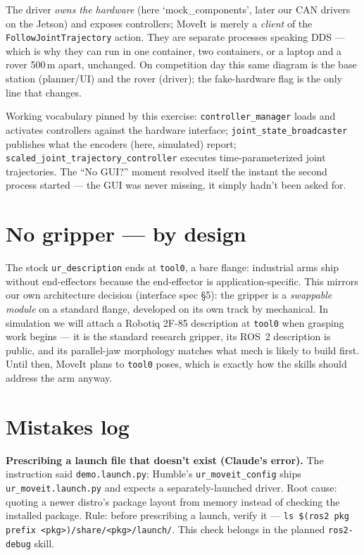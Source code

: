 The driver \emph{owns the hardware} (here `mock\_components', later our CAN drivers on the
Jetson) and exposes controllers; MoveIt is merely a \emph{client} of the
\texttt{FollowJointTrajectory} action. They are separate processes speaking DDS --- which is
why they can run in one container, two containers, or a laptop and a rover 500\,m apart,
unchanged. On competition day this same diagram is the base station (planner/UI) and the rover
(driver); the fake-hardware flag is the only line that changes.

Working vocabulary pinned by this exercise: \texttt{controller\_manager} loads and activates
controllers against the hardware interface; \texttt{joint\_state\_broadcaster} publishes what
the encoders (here, simulated) report; \texttt{scaled\_joint\_trajectory\_controller} executes
time-parameterized joint trajectories. The ``No GUI?'' moment resolved itself the instant the
second process started --- the GUI was never missing, it simply hadn't been asked for.

\section{No gripper --- by design}
\label{sec:no-gripper}

The stock \texttt{ur\_description} ends at \texttt{tool0}, a bare flange: industrial arms ship
without end-effectors because the end-effector is application-specific. This mirrors our own
architecture decision (interface spec \S 5): the gripper is a \emph{swappable module} on a
standard flange, developed on its own track by mechanical. In simulation we will attach a
Robotiq 2F-85 description at \texttt{tool0} when grasping work begins --- it is the standard
research gripper, its ROS~2 description is public, and its parallel-jaw morphology matches what
mech is likely to build first. Until then, MoveIt plans to \texttt{tool0} poses, which is
exactly how the skills should address the arm anyway.

\section{Mistakes log}

\begin{lesson}
\textbf{Prescribing a launch file that doesn't exist (Claude's error).} The instruction said
\texttt{demo.launch.py}; Humble's \texttt{ur\_moveit\_config} ships \texttt{ur\_moveit.launch.py}
and expects a separately-launched driver. Root cause: quoting a newer distro's package layout
from memory instead of checking the installed package. Rule: before prescribing a launch,
verify it --- \texttt{ls \$(ros2 pkg prefix <pkg>)/share/<pkg>/launch/}. This check belongs in
the planned \texttt{ros2-debug} skill.
\end{lesson}

